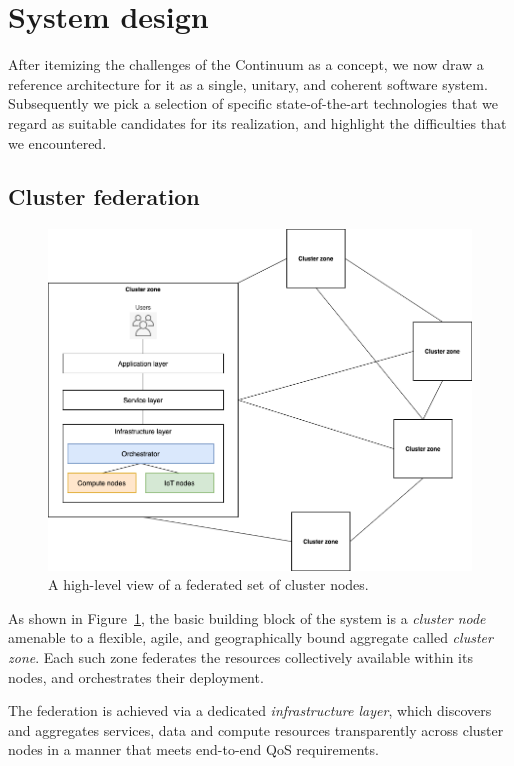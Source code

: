 \section{System design}
\label{sec:technicals}

After itemizing the challenges of the Continuum as a concept, we now draw a reference architecture for it as a single, unitary, and coherent software system.
Subsequently we pick a selection of specific state-of-the-art technologies that we regard as suitable candidates for its realization, and highlight the difficulties that we encountered. 

\subsection{Cluster federation}

\begin{figure}[ht]
\centering
\includegraphics[width=0.75\columnwidth]{figures/architecture-federation}
\caption{A high-level view of a federated set of cluster nodes.} \label{fig:architecture-federation}
\end{figure}

As shown in Figure~\ref{fig:architecture-federation}, 
the basic building block of the system is a \textit{cluster node} amenable to a flexible, agile, and geographically bound aggregate called \textit{cluster zone}.
Each such zone federates the resources collectively available within its nodes, and orchestrates their deployment. 

The federation is achieved via a dedicated \textit{infrastructure layer}, which discovers and aggregates services, data and compute resources transparently across cluster nodes in a manner that meets end-to-end QoS requirements.

